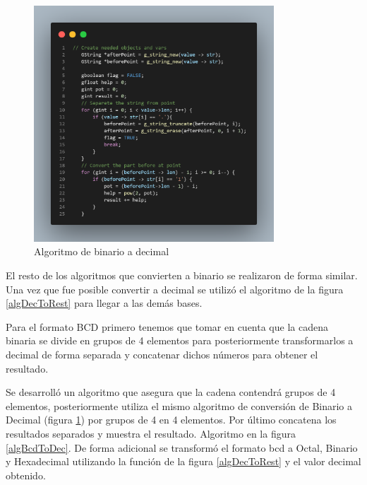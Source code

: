 \documentclass[letterpaper,12pt]{extarticle}%
\begin{document}
\begin{multicols}{2}
			\begin{figure}[H]
			\begin{center}
			\includegraphics[width=9cm]{imag//algBinToDec.png}
			\caption{Algoritmo de binario a decimal}
			\label{algBinToDec}
			\end{center}
			\end{figure}

			El resto de los algoritmos que convierten a binario se realizaron de forma similar. Una vez que fue
			posible convertir a decimal se utilizó el algoritmo de la figura \ref{algDecToRest} para llegar a las 
			demás bases.

			Para el formato BCD primero tenemos que tomar en cuenta que la cadena binaria se divide en grupos de 
			4 elementos para posteriormente transformarlos a decimal de forma separada y concatenar dichos números para 
			obtener el resultado.

			Se desarrolló un algoritmo que asegura que la cadena contendrá grupos de 4 elementos, posteriormente utiliza 
			el mismo algoritmo de conversión de Binario a Decimal (figura \ref{algBinToDec}) por grupos de 4 en 4 elementos.
			Por último concatena los resultados separados y muestra el resultado. Algoritmo en la figura \ref{algBcdToDec}.
			De forma adicional se transformó el formato bcd a Octal, Binario y Hexadecimal utilizando la función de la figura 
			\ref{algDecToRest} y el valor decimal obtenido.


\end{multicols}
\end{document}
